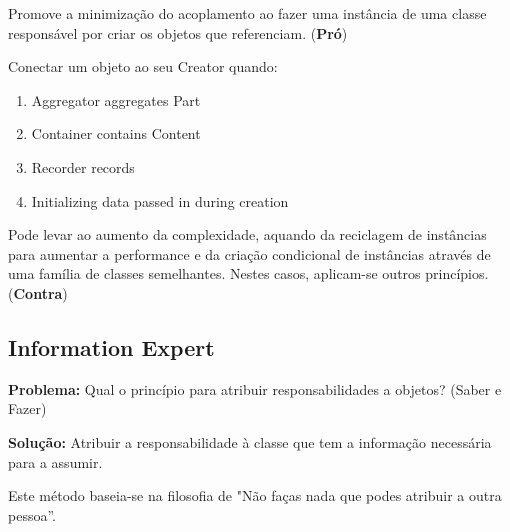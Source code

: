 \documentclass{article}
\begin{document}
Promove a minimização do acoplamento ao fazer uma instância de uma classe responsável
por criar os objetos que referenciam. (\textbf{Pró})

\pagebreak

Conectar um objeto ao seu Creator quando:

\begin{enumerate}
    \item Aggregator aggregates Part
    \item Container contains Content
    \item Recorder records
    \item Initializing data passed in during creation
\end{enumerate}

Pode levar ao aumento da complexidade, aquando da reciclagem de instâncias para
aumentar a performance e da criação condicional de instâncias através de uma
família de classes semelhantes. Nestes casos, aplicam-se outros princípios. (\textbf{Contra})

\subsection{Information Expert}

\begin{flushleft}
    \textbf{Problema:} Qual o princípio para atribuir responsabilidades a objetos? (Saber e Fazer)

    \vspace{3mm}
    \textbf{Solução:} Atribuir a responsabilidade à classe que tem a informação necessária para
    a assumir.

    \vspace{3mm}
    Este método baseia-se na filosofia de "Não faças nada que podes atribuir a outra
pessoa”.
\end{flushleft}
\end{document}
